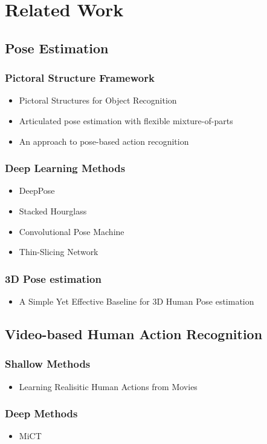 \chapter{Related Work}

\section{Pose Estimation}
\subsection{Pictoral Structure Framework}
\begin{itemize}
    \item Pictoral Structures for Object Recognition \cite{felzenszwalb_pictorial_2005}
    \item Articulated pose estimation with flexible mixture-of-parts \cite{yang_articulated_2011}
    \item An approach to pose-based action recognition \cite{wang_approach_2013}
\end{itemize}

\subsection{Deep Learning Methods}
\begin{itemize}
    \item DeepPose \cite{toshev_deeppose:_2014}
    \item Stacked Hourglass \cite{newell_stacked_2016}
    \item Convolutional Pose Machine \cite{wei_convolutional_2016}
    \item Thin-Slicing Network \cite{song_thin-slicing_2017}
\end{itemize}

\subsection{3D Pose estimation}
\begin{itemize}
    \item A Simple Yet Effective Baseline for 3D Human Pose estimation \cite{martinez_simple_2017}
\end{itemize}

\section{Video-based Human Action Recognition}
\subsection{Shallow Methods}
\begin{itemize}
    \item Learning Realisitic Human Actions from Movies \cite{laptev_learning_2008}
\end{itemize}

\subsection{Deep Methods}
\begin{itemize}
    \item MiCT \cite{zhou_mict:_2018}
\end{itemize}